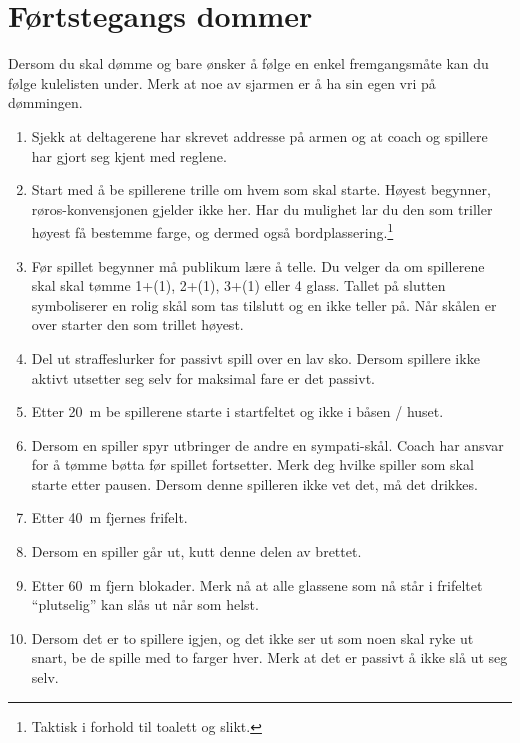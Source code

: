 \documentclass[10pt,a4paper,norsk,openany]{book}
\begin{document}
\section{Førtstegangs dommer} \label{sec:forstegangs-dommer} Dersom du skal
dømme og bare ønsker å følge en enkel fremgangsmåte kan du følge kulelisten
under. Merk at noe av sjarmen er å ha sin egen vri på dømmingen.
%
\begin{enumerate}
    \item Sjekk at deltagerene har skrevet addresse på armen og at coach og
    spillere har gjort seg kjent med reglene.
    
    \item Start med å be spillerene trille om hvem som skal starte. Høyest
    begynner, røros-konvensjonen gjelder ikke her. Har du mulighet lar du den
    som triller høyest få bestemme farge, og dermed også
    bordplassering.\footnote{Taktisk i forhold til toalett og slikt.}
    
  \item Før spillet begynner må publikum lære å telle. Du velger da om
    spillerene skal skal tømme 1+(1), 2+(1), 3+(1) eller 4 glass. Tallet på
    slutten symboliserer en rolig skål som tas tilslutt og en ikke teller på.
    Når skålen er over starter den som trillet høyest.
    
  \item Del ut straffeslurker for passivt spill over en lav sko. Dersom spillere
    ikke aktivt utsetter seg selv for maksimal fare er det passivt.
    
  \item Etter \SI{20}{\m} be spillerene starte i startfeltet og ikke i båsen /
    huset.
    
  \item Dersom en spiller spyr utbringer de andre en sympati-skål. Coach har
    ansvar for å tømme bøtta før spillet fortsetter. Merk deg hvilke spiller som
    skal starte etter pausen. Dersom denne spilleren ikke vet det, må det
    drikkes.
    
  \item Etter \SI{40}{m} fjernes frifelt.
    
  \item Dersom en spiller går ut, kutt denne delen av brettet.
    
  \item Etter \SI{60}{m} fjern blokader. Merk nå at alle glassene som nå står i
    frifeltet ``plutselig'' kan slås ut når som helst.
    
  \item Dersom det er to spillere igjen, og det ikke ser ut som noen skal ryke
    ut snart, be de spille med to farger hver. Merk at det er passivt å ikke slå
    ut seg selv. 
\end{enumerate}
%
\end{document}
